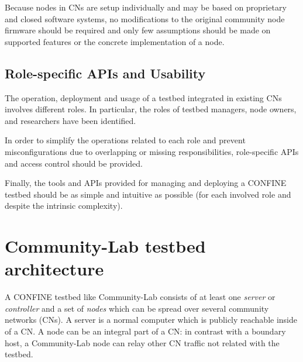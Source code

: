 \documentclass[conference]{IEEEtran}
\begin{document}
Because nodes in CNs are setup individually and may be based on
proprietary and closed software systems, no modifications to the
original community node firmware should be required and only few
assumptions should be made on supported features or the concrete
implementation of a node.


\subsection{Role-specific APIs and Usability}

The operation, deployment and usage of a testbed integrated in
existing CNs involves different roles. In particular, the roles of
testbed managers, node owners, and researchers have been identified.

In order to simplify the operations related to each role and prevent
misconfigurations due to overlapping or missing responsibilities,
role-specific APIs  and access control should be provided.

Finally, the tools and APIs provided for managing and deploying a
CONFINE testbed should be as simple and intuitive as possible (for
each involved role and despite the intrinsic complexity).







\section{Community-Lab testbed architecture}
\label{sec:confine-architecture}

A CONFINE testbed like Community-Lab consists of at least one \emph{server} or \emph{controller}
and a set of \emph{nodes} which can be spread over several community networks
(CNs).  A server is a normal computer which is publicly reachable inside of a
CN.  A node can be an integral part of a CN: in contrast with a boundary host,
a Community-Lab node can relay other CN traffic not related with the testbed.
\end{document}
